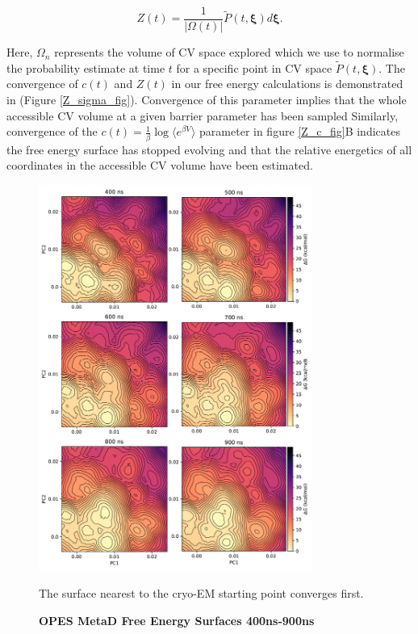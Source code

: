 \begin{equation}
Z(t) = \frac{1}{| \Omega(t)|}  \tilde{P}(t, \mathbf{\xi}) d\mathbf{\xi}.
\end{equation} 

Here, $\Omega_n$ represents the volume of CV space explored which we use to normalise the probability estimate at time $t$ for a specific point in CV space $\tilde{P}(t, \mathbf{\xi})$. The convergence of $c(t)$ and $Z(t)$ in our free energy calculations is demonstrated in (Figure \ref{Z_sigma_fig}). Convergence of this parameter implies that the whole accessible CV volume at a given barrier parameter has been sampled Similarly, convergence of the $c(t) = \frac{1}{\beta} \log \langle e^{\beta V} \rangle$ parameter in figure \ref{Z_c_fig}B indicates the free energy surface has stopped evolving and that the relative energetics of all coordinates in the accessible CV volume have been estimated.  

\begin{figure}
	\begin{center}
		\includegraphics[width=0.8\textwidth]{figures/opening/convergence_1.pdf}
	\end{center}
	\captionsetup{singlelinecheck = false, justification=raggedright}
	\caption[OPES MetaD Free Energy Surfaces 400ns-900ns] {\textbf{OPES MetaD Free Energy Surfaces 400ns-900ns}}{The surface nearest to the cryo-EM starting point converges first.} 
	\label{convergence_opes_1}
\end{figure}


